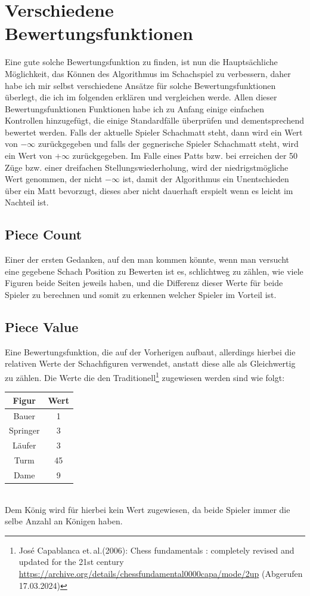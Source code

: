 \documentclass[12pt, a4paper, oneside, openright]{article}
\newcommand \bzw{bzw.\xspace }
\newcommand \etal{et.\,al.\xspace }
\begin{document}
\section{Verschiedene Bewertungsfunktionen}\label{sec:verschiedene-bewertungsfunktionen}
Eine gute solche Bewertungsfunktion zu finden, ist nun die Hauptsächliche Möglichkeit, das Können des Algorithmus im Schachspiel zu verbessern, daher habe ich mir selbst verschiedene Ansätze für solche Bewertungsfunktionen überlegt, die ich im folgenden erklären und vergleichen werde.
Allen dieser Bewertungsfunktionen Funktionen habe ich zu Anfang einige einfachen Kontrollen hinzugefügt, die einige Standardfälle überprüfen und dementsprechend bewertet werden.
Falls der aktuelle Spieler Schachmatt steht, dann wird ein Wert von $ - \infty $ zurückgegeben und falls der gegnerische Spieler Schachmatt steht, wird ein Wert von $+\infty$ zurückgegeben.
Im Falle eines Patts \bzw bei erreichen der 50 Züge \bzw einer dreifachen Stellungswiederholung, wird der niedrigstmögliche Wert genommen, der nicht $ - \infty$ ist, damit der Algorithmus ein Unentschieden über ein Matt bevorzugt, dieses aber nicht dauerhaft erspielt wenn es leicht im Nachteil ist.
\subsection{Piece Count}\label{subsec:piece-count}
Einer der ersten Gedanken, auf den man kommen könnte, wenn man versucht eine gegebene Schach Position zu Bewerten ist es, schlichtweg zu zählen, wie viele Figuren beide Seiten jeweils haben, und die Differenz dieser Werte für beide Spieler zu berechnen und somit zu erkennen welcher Spieler im Vorteil ist.
\subsection{Piece Value}\label{subsec:piece-value}
Eine Bewertungsfunktion, die auf der Vorherigen aufbaut, allerdings hierbei die relativen Werte der Schachfiguren verwendet, anstatt diese alle als Gleichwertig zu zählen.
Die Werte die den Traditionell\footnote{José Capablanca \etal (2006): Chess fundamentals : completely revised and updated for the 21st century \url{https://archive.org/details/chessfundamental0000capa/mode/2up} (Abgerufen 17.03.2024)} zugewiesen werden sind wie folgt:
\begin{table}[h!]
    \centering
    \begin{tabular}{||c c ||}
        \hline
        Figur & Wert \\ [0.5ex]
        \hline\hline
        Bauer & 1 \\
        \hline
        Springer & 3 \\
        \hline
        Läufer & 3 \\
        \hline
        Turm & 45 \\
        \hline
        Dame & 9 \\
        \hline
    \end{tabular}
\end{table}\label{tab:Piece Values} \\
Dem König wird für hierbei kein Wert zugewiesen, da beide Spieler immer die selbe Anzahl an Königen haben.
\end{document}
